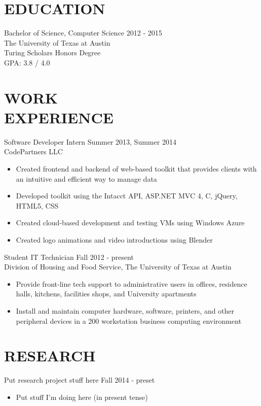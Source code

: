 \documentclass[margin]{res}
\newcommand{\PLUS}{\nolinebreak\hspace{-.05em}\raisebox{.4ex}{\tiny\bf+}}
\newcommand{\CS}{C\nolinebreak\hspace{-.05em}\raisebox{.4ex}{\scriptsize\bf \#}}
\begin{document}
\begin{resume}
 
\section{EDUCATION}
	Bachelor of Science, Computer Science \hfill 2012 - 2015\\
	The University of Texas at Austin\\
	Turing Scholars Honors Degree\\
	GPA: 3.8 / 4.0

\section{WORK \\ EXPERIENCE}
	Software Developer Intern \hfill Summer 2013, Summer 2014 \\
	CodePartners LLC
	\begin{itemize} \itemsep -1pt %
	\item Created frontend and backend of web-based toolkit that provides clients with an intuitive and efficient way to manage data
	\item Developed toolkit using the Intacct API, ASP.NET MVC 4, \CS{}, jQuery, HTML5, CSS
	\item Created cloud-based development and testing VMs using Windows Azure
	\item Created logo animations and video introductions using Blender
	\end{itemize}
 
	Student IT Technician \hfill Fall 2012 - present \\
	Division of Housing and Food Service, The University of Texas at Austin
	\begin{itemize} \itemsep -2pt %
	\item Provide front-line tech support to administrative users in offices, residence halls, kitchens, facilities shops, and University apartments
	\item Install and maintain computer hardware, software, printers, and other peripheral devices in a 200\PLUS{} workstation business computing environment
	\end{itemize}

\section{RESEARCH}
	Put research project stuff here \hfill Fall 2014 - preset
	\begin{itemize} \itemsep -2pt
	\item Put stuff I'm doing here (in present tense)
	\end{itemize}


\end{resume}
\end{document}
